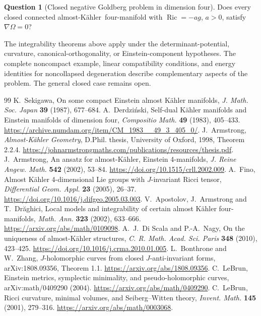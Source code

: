 \documentclass[11pt,a4paper]{article}
\theoremstyle{definition}
\newtheorem{question}[theorem]{Question}
\theoremstyle{remark}
\newcommand{\Ric}{\operatorname{Ric}}
\newcommand{\AK}{almost-K\"ahler}
\begin{document}
\begin{question}[Closed negative Goldberg problem in dimension four]
Does every closed connected \AK\ four-manifold with $\Ric=-ag$, $a>0$, satisfy $\nabla\Omega=0$?
\end{question}
The integrability theorems above apply under the determinant-potential, curvature, canonical-orthogonality, or Einstein-component hypotheses. The complete noncompact example, linear compatibility conditions, and energy identities for noncollapsed degeneration describe complementary aspects of the problem. The general closed case remains open.

\begin{thebibliography}{99}
 K.~Sekigawa, On some compact Einstein almost K\"ahler manifolds, \emph{J. Math. Soc. Japan} \textbf{39} (1987), 677--684.
 A.~Derdzi\'nski, Self-dual K\"ahler manifolds and Einstein manifolds of dimension four, \emph{Compositio Math.} \textbf{49} (1983), 405--433. \url{https://archive.numdam.org/item/CM_1983__49_3_405_0/}.
 J.~Armstrong, \emph{Almost-K\"ahler Geometry}, D.Phil. thesis, University of Oxford, 1998, Theorem 2.2.4. \url{https://johnarmstrongmaths.com/publications/resources/thesis.pdf}.
 J.~Armstrong, An ansatz for almost-K\"ahler, Einstein 4-manifolds, \emph{J. Reine Angew. Math.} \textbf{542} (2002), 53--84. \url{https://doi.org/10.1515/crll.2002.009}.
 A.~Fino, Almost K\"ahler 4-dimensional Lie groups with $J$-invariant Ricci tensor, \emph{Differential Geom. Appl.} \textbf{23} (2005), 26--37. \url{https://doi.org/10.1016/j.difgeo.2005.03.003}.
 V.~Apostolov, J.~Armstrong and T.~Dr\u aghici, Local models and integrability of certain almost K\"ahler four-manifolds, \emph{Math. Ann.} \textbf{323} (2002), 633--666. \url{https://arxiv.org/abs/math/0109098}.
 A.~J.~Di Scala and P.-A.~Nagy, On the uniqueness of almost-K\"ahler structures, \emph{C. R. Math. Acad. Sci. Paris} \textbf{348} (2010), 423--425. \url{https://doi.org/10.1016/j.crma.2010.01.005}.
 L.~Bonthrone and W.~Zhang, $J$-holomorphic curves from closed $J$-anti-invariant forms, arXiv:1808.09356, Theorem 1.1. \url{https://arxiv.org/abs/1808.09356}.
 C.~LeBrun, Einstein metrics, symplectic minimality, and pseudo-holomorphic curves, arXiv:math/0409290 (2004). \url{https://arxiv.org/abs/math/0409290}.
 C.~LeBrun, Ricci curvature, minimal volumes, and Seiberg--Witten theory, \emph{Invent. Math.} \textbf{145} (2001), 279--316. \url{https://arxiv.org/abs/math/0003068}.

\end{thebibliography}
\end{document}
